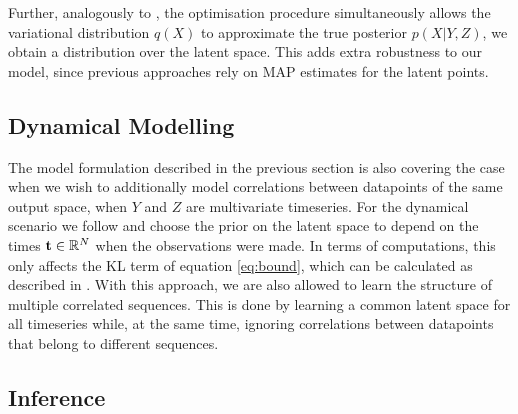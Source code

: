 Further, analogously to \cite{Titsias:bayesGPLVM10,Damianou:vgpds11}, the optimisation procedure simultaneously allows
the variational distribution $q(X)$ to approximate the true posterior $p(X|Y,Z)$, \ie we obtain a distribution
over the latent space. This adds extra robustness to our model, since previous approaches rely on
MAP estimates for the latent points.



\subsection{Dynamical Modelling}

The model formulation described in the previous section is also covering the case
when we wish to additionally model correlations between datapoints of the same output space, \ie when
$Y$ and $Z$ are multivariate timeseries. For the dynamical scenario
we follow \cite{Damianou:vgpds11,Lawrence:hgplvm07} and choose the prior on the
 latent space to depend on the times 
$\mathbf{t} \in \mathbb{R}^N$ when the observations were made. In terms of computations, this
 only affects the KL term of equation \eqref{eq:bound}, which can be calculated as described
 in \cite{Damianou:vgpds11}. With this approach, we are also allowed to 
learn the structure of multiple correlated sequences.
This is done by learning a common latent space for all timeseries while, at the same time, ignoring
correlations between datapoints that belong to different sequences.



\subsection{Inference \label{inference}}

